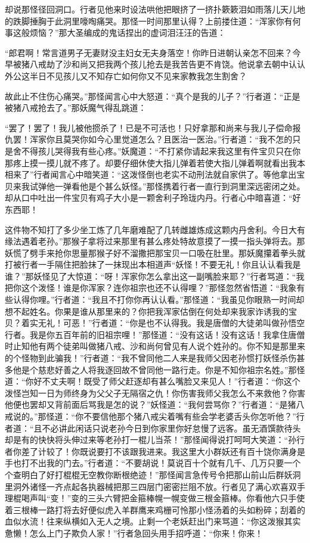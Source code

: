 \documentclass[12pt,UTF8]{ctexbook}
\begin{document}
{却说那怪径回洞口。行者见他来时设法哄他把眼挤了一挤扑簌簌泪如雨落儿天儿地的跌脚捶胸于此洞里嚎啕痛哭。那怪一时间那里认得？上前搂住道：“浑家你有何事这般烦恼？”那大圣编成的鬼话捏出的虚词泪汪汪的告道：

“郎君啊！常言道男子无妻财没主妇女无夫身落空！你昨日进朝认亲怎不回来？今早被猪八戒劫了沙和尚又把我两个孩儿抢去是我苦告更不肯饶。他说拿去朝中认认外公这半日不见孩儿又不知存亡如何你又不见来家教我怎生割舍？

故此止不住伤心痛哭。”那怪闻言心中大怒道：“真个是我的儿子？”行者道：“正是被猪八戒抢去了。”那妖魔气得乱跳道：

“罢了！罢了！我儿被他掼杀了！已是不可活也！只好拿那和尚来与我儿子偿命报仇罢！浑家你且莫哭你如今心里觉道怎么？且医治一医治。”行者道：“我不怎的只是舍不得孩儿哭得我有些心疼。”妖魔道：“不打紧你请起来我这里有件宝贝只在你那疼上摸一摸儿就不疼了。却要仔细休使大指儿弹着若使大指儿弹着啊就看出我本相来了”行者闻言心中暗笑道：“这泼怪倒也老实不动刑法就自家供了。等他拿出宝贝来我试弹他一弹看他是个甚么妖怪。”那怪携着行者一直行到洞里深远密闭之处。却从口中吐出一件宝贝有鸡子大小是一颗舍利子玲珑内丹。行者心中暗喜道：“好东西耶！

这件物不知打了多少坐工炼了几年磨难配了几转雌雄炼成这颗内丹舍利。今日大有缘法遇着老孙。”那猴子拿将过来那里有甚么疼处特故意摸了一摸一指头弹将去。那妖慌了劈手来抢你思量那猴子好不溜撒把那宝贝一口吸在肚里。那妖魔攥着拳头就打被行者一手隔住把脸抹了一抹现出本相道声“妖怪！不要无礼！你且认认看我是谁？”那妖怪见了大惊道：“呀！浑家你怎么拿出这一副嘴脸来耶？”行者骂道：“我把你这个泼怪！谁是你浑家？连你祖宗也还不认得哩？”那怪忽然省悟道：“我象有些认得你哩。”行者道：“我且不打你你再认认看。”那怪道：“我虽见你眼熟一时间却想不起姓名。你果是谁从那里来的？你把我浑家估倒在何处却来我家诈诱我的宝贝？着实无礼！可恶！”行者道：“你是也不认得我。我是唐僧的大徒弟叫做孙悟空行者。我是你五百年前的旧祖宗哩！”那怪道：“没有这话！没有这话！我拿住唐僧时止知他有两个徒弟叫做猪八戒、沙和尚何曾见有人说个姓孙的。你不知是那里来的个怪物到此骗我！”行者道：“我不曾同他二人来是我师父因老孙惯打妖怪杀伤甚多他是个慈悲好善之人将我逐回故不曾同他一路行走。你是不知你祖宗名姓。”那怪道：“你好不丈夫啊！既受了师父赶逐却有甚么嘴脸又来见人！”行者道：“你这个泼怪岂知一日为师终身为父父子无隔宿之仇！你伤害我师父我怎么不来救他？你害他便也罢却又背前面后骂我是怎的说？”妖怪道：“我何尝骂你？”行者道：“是猪八戒说的。”那怪道：“你不要信他那个猪八戒尖着嘴有些会学老婆舌头你怎听他？”行者道：“且不必讲此闲话只说老孙今日到你家里你好怠慢了远客。虽无酒馔款待头却是有的快快将头伸过来等老孙打一棍儿当茶！”那怪闻得说打呵呵大笑道：“孙行者你差了计较了！你既说要打不该跟我进来。我这里大小群妖还有百十饶你满身是手也打不出我的门去。”行者道：“不要胡说！莫说百十个就有几千、几万只要一个个查明白了好打棍棍无空教你断根绝迹！”那怪闻言急传号令把那山前山后群妖洞里洞外诸怪一齐点起各执器械把那三四层门密密拦阻不放。行者见了满心欢喜双手理棍喝声叫“变！”变的三头六臂把金箍棒幌一幌变做三根金箍棒。你看他六只手使着三根棒一路打将去好便似虎入羊群鹰来鸡栅可怜那小怪汤着的头如粉碎；刮着的血似水流！往来纵横如入无人之境。止剩一个老妖赶出门来骂道：“你这泼猴其实惫懒！怎么上门子欺负人家！”行者急回头用手招呼道：“你来！你来！

}
\end{document}
